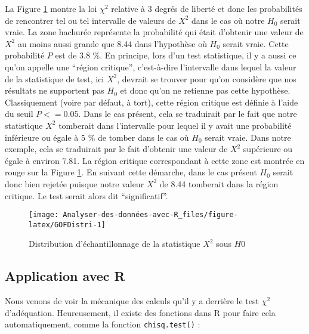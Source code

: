 \documentclass[
]{book}
\newenvironment{Shaded}{\begin{snugshade}}{\end{snugshade}}
\newcommand{\AttributeTok}[1]{\textcolor[rgb]{0.77,0.63,0.00}{#1}}
\newcommand{\FloatTok}[1]{\textcolor[rgb]{0.00,0.00,0.81}{#1}}
\newcommand{\FunctionTok}[1]{\textcolor[rgb]{0.00,0.00,0.00}{#1}}
\newcommand{\NormalTok}[1]{#1}
\newcommand{\OtherTok}[1]{\textcolor[rgb]{0.56,0.35,0.01}{#1}}
\newcommand{\SpecialCharTok}[1]{\textcolor[rgb]{0.00,0.00,0.00}{#1}}
\begin{document}
La Figure \ref{fig:GOFDistri} montre la loi \(\chi^2\) relative à 3 degrés de liberté et donc les probabilités de rencontrer tel ou tel intervalle de valeurs de \(X^2\) dans le cas où notre \(H_{0}\) serait vraie. La zone hachurée représente la probabilité qui était d'obtenir une valeur de \(X^2\) au moins aussi grande que 8.44 dans l'hypothèse où \(H_{0}\) serait vraie. Cette probabilité \(P\) est de 3.8 \%. En principe, lors d'un test statistique, il y a aussi ce qu'on appelle une ``région critique'', c'est-à-dire l'intervalle dans lequel la valeur de la statistique de test, ici \(X^2\), devrait se trouver pour qu'on considère que nos résultats ne supportent pas \(H_{0}\) et donc qu'on ne retienne pas cette hypothèse. Classiquement (voire par défaut, à tort), cette région critique est définie à l'aide du seuil \(P <= 0.05\). Dans le cas présent, cela se traduirait par le fait que notre statistique \(X^2\) tomberait dans l'intervalle pour lequel il y avait une probabilité inférieure ou égale à 5 \% de tomber dans le cas où \(H_{0}\) serait vraie. Dans notre exemple, cela se traduirait par le fait d'obtenir une valeur de \(X^2\) supérieure ou égale à environ 7.81. La région critique correspondant à cette zone est montrée en rouge sur la Figure \ref{fig:GOFDistri}. En suivant cette démarche, dans le cas présent \(H_{0}\) serait donc bien rejetée puisque notre valeur \(X^2\) de 8.44 tomberait dans la région critique. Le test serait alors dit ``significatif''.

\begin{figure}

{\centering \texttt{[image: Analyser-des-données-avec-R\_files/figure-latex/GOFDistri-1]} 

}

\caption{Distribution d'échantillonnage de la statistique $X^2$ sous $H{0}$}\label{fig:GOFDistri}
\end{figure}

\hypertarget{application-avec-r}{%
\subsection{Application avec R}\label{application-avec-r}}

Nous venons de voir la mécanique des calculs qu'il y a derrière le test \(\chi^2\) d'adéquation. Heureusement, il existe des fonctions dans R pour faire cela automatiquement, comme la fonction \texttt{chisq.test()} :

\begin{Shaded}
\end{Shaded}
\end{document}
